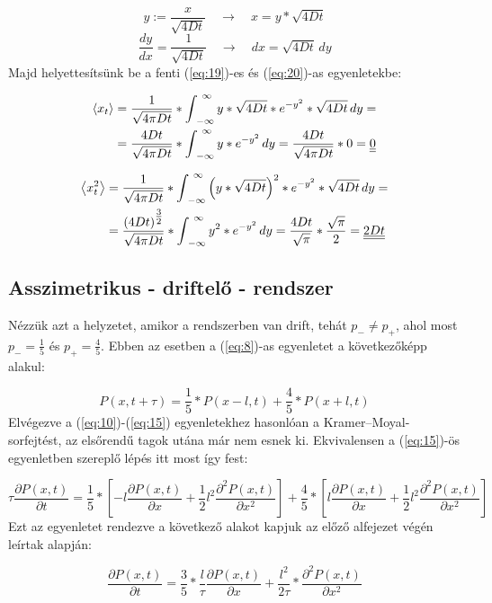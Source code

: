\begin{equation*}
    y := \frac{x}{\sqrt{4Dt}} \quad \to \quad x = y * \sqrt{4Dt}
\end{equation*}
\begin{equation*}
    \frac{dy}{dx} = \frac{1}{\sqrt{4Dt}} \quad \to \quad dx = \sqrt{4Dt}\, dy
\end{equation*}
Majd helyettesítsünk be a fenti (\ref{eq:19})-es és (\ref{eq:20})-as egyenletekbe:

\begin{align} \label{eq:21}
    \left< x_{t} \right>
    &=
    \frac{1}{\sqrt{4 \pi D t}} * \int_{\ -\infty}^{\ \infty} y * \sqrt{4Dt} * e^{-y^{2}} * \sqrt{4Dt}\, dy = \nonumber \\
    &=
    \frac{4Dt}{\sqrt{4 \pi D t}} * \int_{\ -\infty}^{\ \infty} y * e^{-y^{2}}\, dy
    =
    \frac{4Dt}{\sqrt{4 \pi D t}} * 0 = \underline{\underline{0}}
\end{align}

\begin{align} \label{eq:22}
    \left< x_{t}^{2} \right>
    &=
    \frac{1}{\sqrt{4 \pi D t}} * \int_{\ -\infty}^{\ \infty} \left( y * \sqrt{4Dt} \right)^{2} * e^{-y^{2}} * \sqrt{4Dt}\, dy = \nonumber \\
    &=
    \frac{\left( 4Dt \right)^{\tfrac{3}{2}}}{\sqrt{4 \pi D t}} * \int_{\ -\infty}^{\ \infty} y^{2} * e^{-y^{2}}\, dy
    =
    \frac{4Dt}{\sqrt{\pi}} * \frac{\sqrt{\pi}}{2}
    =
    \doubleunderline{2Dt}
\end{align}

\subsection{Asszimetrikus - driftelő - rendszer}
Nézzük azt a helyzetet, amikor a rendszerben van drift, tehát $p_{-} \neq p_{+}$, ahol most $p_{-} = \frac{1}{5}$ és $p_{+} = \frac{4}{5}$. Ebben az esetben a (\ref{eq:8})-as egyenletet a következőképp alakul:

\begin{equation}
    P \left( x, t + \tau \right)
    =
    \frac{1}{5} * P \left( x - l, t \right) + \frac{4}{5} * P \left( x + l, t \right)
\end{equation}
Elvégezve a (\ref{eq:10})-(\ref{eq:15}) egyenletekhez hasonlóan a Kramer--Moyal-sorfejtést, az elsőrendű tagok utána már nem esnek ki. Ekvivalensen a (\ref{eq:15})-ös egyenletben szereplő lépés itt most így fest:

\begin{equation}
    \tau \frac{\partial P \left( x, t \right)}{\partial t}
    =
    \frac{1}{5} * \left[ -l \frac{\partial P \left( x, t \right)}{\partial x} + \frac{1}{2} l^{2} \frac{\partial^{2} P \left( x, t \right)}{\partial x^{2}} \right] + \frac{4}{5} * \left[ l \frac{\partial P \left( x, t \right)}{\partial x} + \frac{1}{2} l^{2} \frac{\partial^{2} P \left( x, t \right)}{\partial x^{2}} \right]
\end{equation}
Ezt az egyenletet rendezve a következő alakot kapjuk az előző alfejezet végén leírtak alapján:

\begin{equation}
    \frac{\partial P \left( x, t \right)}{\partial t}
    =
    \frac{3}{5} * \frac{l}{\tau} \frac{\partial P \left( x, t \right)}{\partial x} + \frac{l^{2}}{2 \tau} * \frac{\partial^{2} P \left( x, t \right)}{\partial x^{2}}
\end{equation}